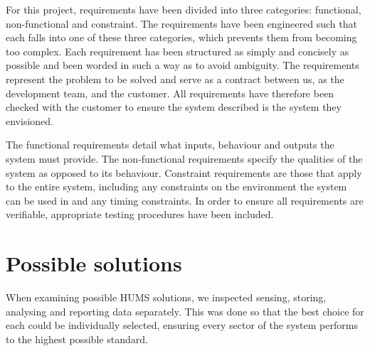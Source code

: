 \documentclass[10pt,a4paper]{article}
\begin{document}
For this project, requirements have been divided into three categories:
functional, non-functional and constraint. The requirements have been
engineered such that each falls into one of these three categories, which
prevents them from becoming too complex. Each requirement has been
structured as simply and concisely as possible and been worded in such a way
as to avoid ambiguity. The requirements represent the problem to be solved
and serve as a contract between us, as the development team, and the
customer. All requirements have therefore been checked with the customer to
ensure the system described is the system they envisioned.

The functional requirements detail what inputs, behaviour and outputs the system
must provide. The non-functional requirements specify the qualities of the
system as opposed to its behaviour. Constraint requirements are those that apply
to the entire system, including any constraints on the environment the system
can be used in and any timing constraints. In order to ensure all requirements
are verifiable, appropriate testing procedures have been included.








\section{Possible solutions}

When examining possible HUMS solutions, we inspected sensing, storing, analysing
and reporting data separately. This was done so that the best choice for each
could be individually selected, ensuring every sector of the system performs to
the highest possible standard.
\end{document}
